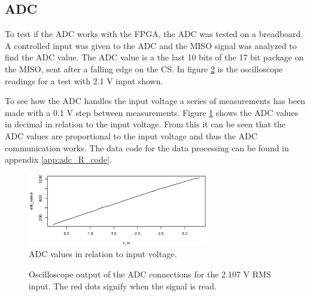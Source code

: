 \subsection{ADC}
To test if the ADC works with the FPGA, the ADC was tested on a breadboard.
A controlled input was given to the ADC and the MISO signal was analyzed to find the ADC value.
The ADC value is a the last 10 bits of the 17 bit package on the MISO, sent after a falling edge on the CS.
In figure \ref{fig:scope_adc} is the oscilloscope readings for a test with 2.1 V input shown.

To see how the ADC handles the input voltage a series of measurements has been made with a 0.1 V step between measurements.
Figure \ref{fig:adc_values} shows the ADC values in decimal in relation to the input voltage.
From this it can be seen that the ADC values are proportional to the input voltage and thus the ADC communication works.
The data code for the data processing can be found in appendix \ref{app:adc_R_code}.

\begin{figure}[h]
 \centering
 \includegraphics[width=0.7\textwidth]{img/ADC_values}
 \caption{ADC values in relation to input voltage.}
 \label{fig:adc_values}
\end{figure}

\begin{figure}[h]
    \centering
    \caption[Oscilloscope measurements for ADC]
            {Oscilloscope output of the ADC connections for the 2.107 V RMS input. The red dots signify when the signal is read.}
            \label{fig:scope_adc}
\end{figure}
